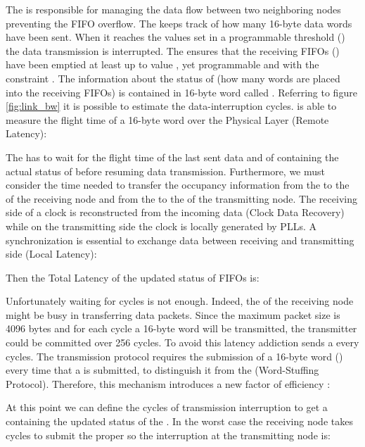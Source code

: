 The  is responsible for managing the data flow between
two neighboring nodes preventing the FIFO overflow. The 
keeps track of how many 16-byte data words have been sent. When it
reaches the values set in a programmable threshold () the
data transmission is interrupted.
The  ensures that the receiving FIFOs ()
have been emptied at least up to value , yet programmable
and with the constraint .
The information about the status of  (how many words
are placed into the receiving FIFOs) is contained in 16-byte word
called \credit.
Referring to figure \ref{fig:link_bw} it is possible to estimate the
data-interruption cycles.  is able to measure the flight
time of a 16-byte word over the Physical Layer (Remote Latency):

   


The  has to wait for the flight time of the last sent
data and of \credit containing the actual status of 
before resuming data transmission.
Furthermore, we must consider the time needed to transfer the
occupancy information from the  to the 
of the receiving node and from the  to the  of
the transmitting node. The receiving side of a  clock is
reconstructed from the incoming data (Clock Data Recovery) while on
the transmitting side the clock is locally generated by PLLs. A
synchronization is essential to exchange data between receiving and
transmitting side (Local Latency):

   


Then the Total Latency of the updated status of FIFOs is:

 


Unfortunately waiting for  cycles is not enough. Indeed, the
 of the receiving node might be busy in transferring data
packets. Since the maximum packet size is 4096 bytes and for each
cycle a 16-byte word will be transmitted, the transmitter could be
committed over 256 cycles. To avoid this latency addiction  sends a \credit every  cycles.
The transmission protocol requires the submission of a 16-byte word
(\magic) every time that a \credit is submitted, to distinguish it
from the \payload (Word-Stuffing Protocol). Therefore, this mechanism
introduces a new factor of efficiency :




At this point we can define the  cycles of transmission
interruption to get a \credit containing the updated status of the
.  In the worst case the receiving node takes 
cycles to submit the proper \credit so the interruption at the
transmitting node is:




